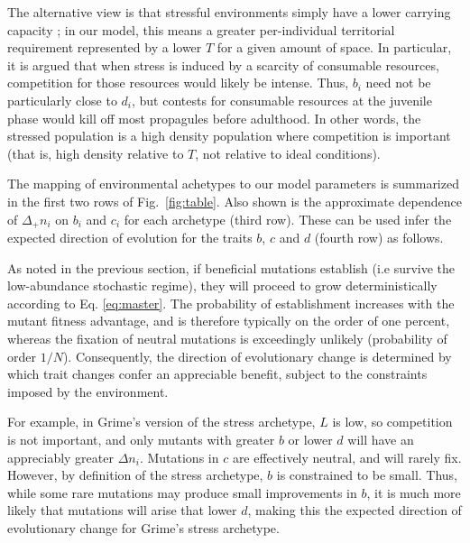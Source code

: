 \documentclass[11pt]{article}
\begin{document}
The alternative view is that stressful environments simply have a lower carrying capacity \citep{taylor_1990}; in our model, this means a greater per-individual territorial requirement represented by a lower $T$ for a given amount of space. In particular, it is argued that when stress is induced by a scarcity of consumable resources, competition for those resources would likely be intense. Thus, $b_i$ need not be particularly close to $d_i$, but contests for consumable resources at the juvenile phase would kill off most propagules before adulthood. In other words, the stressed population is a high density population where competition is important \citep{taylor_1990} (that is, high density relative to $T$, not relative to ideal conditions). 

The mapping of environmental achetypes to our model parameters is summarized in the first two rows of Fig.~\ref{fig:table}. Also shown is the approximate dependence of $\Delta_+ n_i$ on $b_i$ and $c_i$ for each archetype (third row). These can be used infer the expected direction of evolution for the traits $b$, $c$ and $d$ (fourth row) as follows. 

As noted in the previous section, if beneficial mutations establish (i.e survive the low-abundance stochastic regime), they will proceed to grow deterministically according to Eq. \eqref{eq:master}. The probability of establishment increases with the mutant fitness advantage, and is therefore typically on the order of one percent, whereas the fixation of neutral mutations is exceedingly unlikely (probability of order $1/N$). Consequently, the direction of evolutionary change is determined by which trait changes confer an appreciable benefit, subject to the constraints imposed by the environment. 

For example, in Grime's version of the stress archetype, $L$ is low, so competition is not important, and only mutants with greater $b$ or lower $d$ will have an appreciably greater $\Delta n_i$. Mutations in $c$ are effectively neutral, and will rarely fix. However, by definition of the stress archetype, $b$ is constrained to be small. Thus, while some rare mutations may produce small improvements in $b$, it is much more likely that mutations will arise that lower $d$, making this the expected direction of evolutionary change for Grime's stress archetype. 
\end{document}
